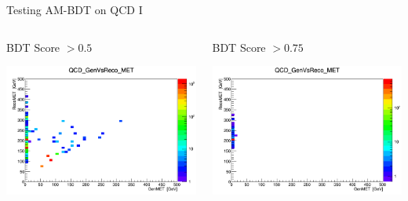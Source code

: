\documentclass[8pt]{beamer}
\begin{document}
\begin{frame}{Testing AM-BDT on QCD I}
 
\begin{columns}

\begin{block}{BDT Score $> 0.5$}
 
\centering
\includegraphics[width=\linewidth]{img/BDT0p5_QCD_GenVsReco_MET.png} 
 
\end{block}

\begin{block}{BDT Score $> 0.75$}
 
\centering
\includegraphics[width=\linewidth]{img/BDT0p75_QCD_GenVsReco_MET.png} 
 
\end{block}

\end{columns} 
 
\end{frame}
\end{document}

